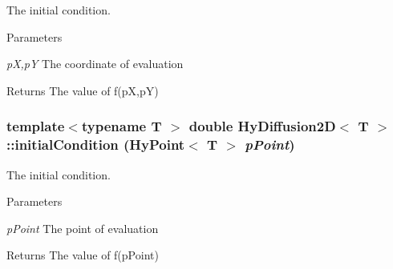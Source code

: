 The initial condition. 


\begin{DoxyParams}{Parameters}
\item[{\em pX,pY}]The coordinate of evaluation \end{DoxyParams}
\begin{DoxyReturn}{Returns}
The value of f(pX,pY) 
\end{DoxyReturn}
\hypertarget{classHyDiffusion2D_a07622cf68cbd0571101807eedcb3a76d}{
\subsubsection[{initialCondition}]{\setlength{\rightskip}{0pt plus 5cm}template$<$typename T $>$ double {\bf HyDiffusion2D}$<$ T $>$::initialCondition ({\bf HyPoint}$<$ T $>$ {\em pPoint})}}
\label{classHyDiffusion2D_a07622cf68cbd0571101807eedcb3a76d}


The initial condition. 


\begin{DoxyParams}{Parameters}
\item[{\em pPoint}]The point of evaluation \end{DoxyParams}
\begin{DoxyReturn}{Returns}
The value of f(pPoint) 
\end{DoxyReturn}


